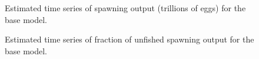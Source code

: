 \documentclass[
]{scrartcl}
\begin{document}
\endgroup

\begin{figure}[H]


\caption{\label{fig-es-sb}Estimated time series of spawning output
(trillions of eggs) for the base model.}

\end{figure}%

\begin{figure}[H]


\caption{\label{fig-es-depl}Estimated time series of fraction of
unfished spawning output for the base model.}

\end{figure}%
\end{document}
